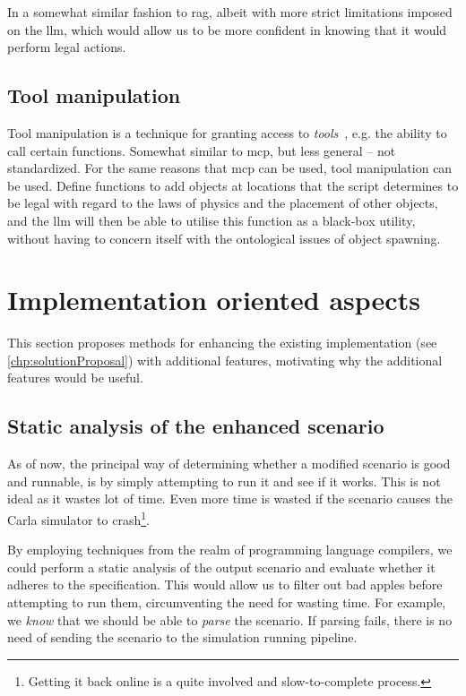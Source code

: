 In a somewhat similar fashion to \acrshort{rag}, albeit with more strict limitations imposed on the
\acrshort{llm}, which would allow us to be more confident in knowing that it would perform legal actions.

\subsection{Tool manipulation}

Tool manipulation is a technique for granting  access to
\emph{tools}~\cite[62]{llmSurvey}, e.g. the ability to call certain functions. Somewhat similar to
\acrshort{mcp}, but less general -- not standardized. For the same reasons that \acrshort{mcp} can
be used, tool manipulation can be used. Define functions to add objects at locations that the script
determines to be legal with regard to the laws of physics and the placement of other objects, and
the \acrshort{llm} will then be able to utilise this function as a black-box utility, without
having to concern itself with the ontological issues of object spawning.

\section{Implementation oriented aspects}

This section proposes methods for enhancing the existing implementation (see
\cref{chp:solutionProposal}) with additional features, motivating why the
additional features would be useful.

\subsection{Static analysis of the enhanced scenario}

As of now, the principal way of determining whether a modified scenario is good and runnable, is by
simply attempting to run it and see if it works. This is not ideal as it wastes lot of time. Even
more time is wasted if the scenario causes the Carla simulator to crash\footnote{Getting it back
    online is a quite involved and slow-to-complete process.}.

By employing techniques from the realm of programming language compilers, we could perform a static
analysis of the output scenario and evaluate whether it adheres to the specification. This would
allow us to filter out bad apples before attempting to run them, circumventing the need for wasting
time.
For example, we \emph{know} that we should be able to \emph{parse} the scenario. If parsing
fails, there is no need of sending the scenario to the simulation running pipeline.

